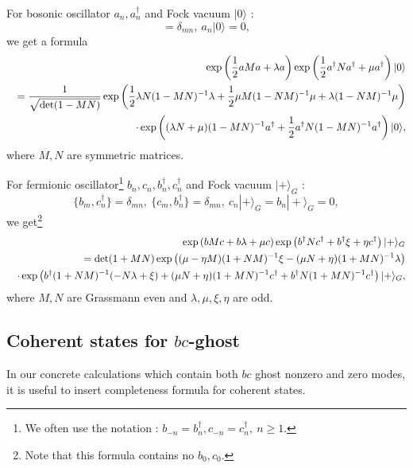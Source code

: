 \documentclass[12pt,a4paper]{article}
\begin{document}
For bosonic oscillator $a_n,a_n^\dagger$ and Fock vacuum $|0\rangle$ :
\begin{equation}
[a_m,a_n^\dagger]=\delta_{mn},\ a_n|0\rangle=0,
\end{equation}
we get a formula
\begin{eqnarray}
&&\exp\left({1\over2}aMa+\lambda a\right)\exp\left({1\over2}a^\dagger Na^\dagger+\mu a^\dagger\right)|0\rangle\nonumber\\
&&={1\over\sqrt{{\rm det}(1-MN)}}\exp\left({1\over2}\lambda N(1-MN)^{-1}\lambda+{1\over2}\mu M(1-NM)^{-1}\mu+\lambda(1-NM)^{-1}\mu\right)\nonumber \\
&&\cdot \exp\left((\lambda N+\mu)(1-MN)^{-1}a^\dagger+{1\over2}a^\dagger N(1-MN)^{-1}a^\dagger\right)|0\rangle,
\end{eqnarray}
where $M,N$ are symmetric matrices.

For fermionic oscillator\footnote{
	We often use the notation :  $b_{-n}=b_n^\dagger,c_{-n}=c_n^\dagger,\ n\geq1$.
} $b_n,c_n,b_n^\dagger,c_n^\dagger$ and Fock vacuum $|+\rangle_G$ :
\begin{equation}
\{b_m,c_n^\dagger\}=\delta_{mn},\ \{c_m,b_n^\dagger\}=\delta_{mn},\ c_n|+\rangle_G=b_n|+\rangle_G=0,
\end{equation}
we get\footnote{
	Note that this formula contains no $b_0,c_0$.
}
\begin{eqnarray}
&&\exp\left(bMc+b\lambda+\mu c\right)\exp\left(b^\dagger Nc^\dagger+b^\dagger\xi+\eta c^\dagger\right)|+\rangle_G\nonumber \\
&&={\rm det}(1+MN)\exp\left((\mu-\eta M)(1+NM)^{-1}\xi-(\mu N+\eta)(1+MN)^{-1}\lambda\right)\nonumber \\
&&\cdot \exp\left(b^\dagger(1+NM)^{-1}(-N\lambda+\xi)+(\mu N+\eta)(1+MN)^{-1}c^\dagger+b^\dagger N(1+MN)^{-1}c^\dagger\right)|+\rangle_G,\nonumber \\
\end{eqnarray}
where $M,N$ are Grassmann even and $\lambda,\mu,\xi,\eta$ are odd.\\


\subsection{Coherent states for $bc$-ghost}

In our concrete calculations which contain both $bc$ ghost nonzero and zero modes, it is useful to insert completeness formula for coherent states.
\end{document}
